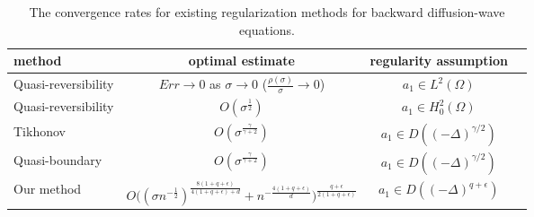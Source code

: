\documentclass[11pt]{article}
\numberwithin{equation}{section}
\begin{document}
\begin{table}[!ht]%
\caption{The convergence rates for existing regularization methods for backward diffusion-wave equations.}
\renewcommand{\arraystretch}{1.25}
\def\temptablewidth{1\textwidth}
\begin{center}
 \begin{tabular*}{\temptablewidth}{@{\extracolsep{\fill}}lccc}\hline
 method       &optimal estimate                    &regularity assumption     \\ \hline
 Quasi-reversibility \cite{Wen2023solving}          & $Err\rightarrow0$ as $\sigma\rightarrow0$ ($\frac{\rho(\sigma)}{\sigma}\rightarrow0$) &$a_1\in L^2(\Omega)$ \\ \hline
 Quasi-reversibility \cite{WenJ2023backward}          & $O(\sigma^{\frac12})$ &$a_1\in H_0^2(\Omega)$ \\ \hline
Tikhonov \cite{Wei2018backward}          & $O(\sigma^{\frac{\gamma}{\gamma+2}})$ &$a_1\in D((-\Delta)^{\gamma/2})$ \\ \hline
Quasi-boundary \cite{Zhang2022backward}          & $O(\sigma^{\frac{\gamma}{\gamma+2}})$ &$a_1\in D((-\Delta)^{\gamma/2})$ \\ \hline             
Our method & $O\bigg((\sigma n^{-\frac{1}{2}})^{\frac{8(1+q+\epsilon)}{4(1+q+\epsilon)+d}} +n^{-\frac{4(1+q+\epsilon)}{d}}\bigg)^{\frac{q+\epsilon}{2(1+q+\epsilon)}}$  & $a_1\in D((-\Delta)^{q+\epsilon})$ \\ \hline
\end{tabular*}
\end{center}
\end{table}
\end{document}
